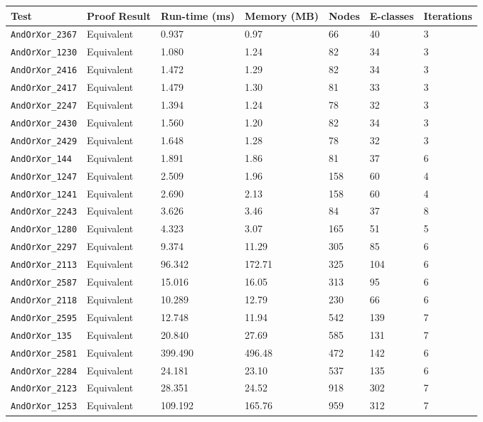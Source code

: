 \begin{tabular}{lllllll}
\toprule
\textbf{Test} & \textbf{Proof Result} & \textbf{Run-time (ms)} & \textbf{Memory (MB)} & \textbf{Nodes} & \textbf{E-classes} & \textbf{Iterations} \\
\midrule
\texttt{AndOrXor\_2367} & Equivalent & 0.937 & 0.97 & 66 & 40 & 3 \\
\texttt{AndOrXor\_1230} & Equivalent & 1.080 & 1.24 & 82 & 34 & 3 \\
\texttt{AndOrXor\_2416} & Equivalent & 1.472 & 1.29 & 82 & 34 & 3 \\
\texttt{AndOrXor\_2417} & Equivalent & 1.479 & 1.30 & 81 & 33 & 3 \\
\texttt{AndOrXor\_2247} & Equivalent & 1.394 & 1.24 & 78 & 32 & 3 \\
\texttt{AndOrXor\_2430} & Equivalent & 1.560 & 1.20 & 82 & 34 & 3 \\
\texttt{AndOrXor\_2429} & Equivalent & 1.648 & 1.28 & 78 & 32 & 3 \\
\texttt{AndOrXor\_144} & Equivalent & 1.891 & 1.86 & 81 & 37 & 6 \\
\texttt{AndOrXor\_1247} & Equivalent & 2.509 & 1.96 & 158 & 60 & 4 \\
\texttt{AndOrXor\_1241} & Equivalent & 2.690 & 2.13 & 158 & 60 & 4 \\
\texttt{AndOrXor\_2243} & Equivalent & 3.626 & 3.46 & 84 & 37 & 8 \\
\texttt{AndOrXor\_1280} & Equivalent & 4.323 & 3.07 & 165 & 51 & 5 \\
\texttt{AndOrXor\_2297} & Equivalent & 9.374 & 11.29 & 305 & 85 & 6 \\
\texttt{AndOrXor\_2113} & Equivalent & 96.342 & 172.71 & 325 & 104 & 6 \\
\texttt{AndOrXor\_2587} & Equivalent & 15.016 & 16.05 & 313 & 95 & 6 \\
\texttt{AndOrXor\_2118} & Equivalent & 10.289 & 12.79 & 230 & 66 & 6 \\
\texttt{AndOrXor\_2595} & Equivalent & 12.748 & 11.94 & 542 & 139 & 7 \\
\texttt{AndOrXor\_135} & Equivalent & 20.840 & 27.69 & 585 & 131 & 7 \\
\texttt{AndOrXor\_2581} & Equivalent & 399.490 & 496.48 & 472 & 142 & 6 \\
\texttt{AndOrXor\_2284} & Equivalent & 24.181 & 23.10 & 537 & 135 & 6 \\
\texttt{AndOrXor\_2123} & Equivalent & 28.351 & 24.52 & 918 & 302 & 7 \\
\texttt{AndOrXor\_1253} & Equivalent & 109.192 & 165.76 & 959 & 312 & 7 \\

\end{tabular}
